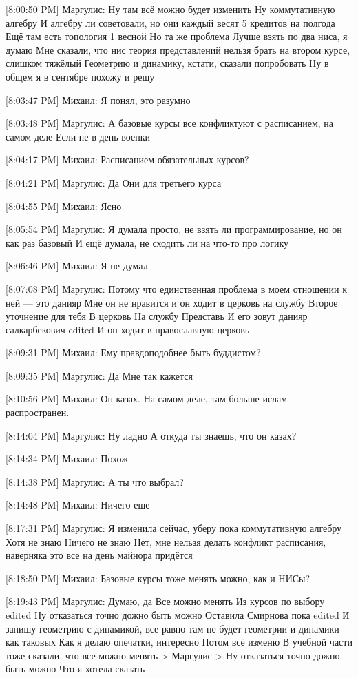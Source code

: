 \documentclass{article}
\begin{document}
[8:00:50 PM] Маргулис:
Ну там всё можно будет изменить
 Ну коммутативную алгебру
 И алгебру ли советовали, но они каждый весят 5 кредитов на полгода
 Ещё там есть топология 1 весной
 Но та же проблема
 Лучше взять по два ниса, я думаю
 Мне сказали, что нис теория представлений нельзя брать на втором курсе, слишком тяжёлый
 Геометрию и динамику, кстати, сказали попробовать
 Ну в общем я в сентябре похожу и решу

[8:03:47 PM] Михаил:
Я понял, это разумно

[8:03:48 PM] Маргулис:
А базовые курсы все конфликтуют с расписанием, на самом деле
 Если не в день военки

[8:04:17 PM] Михаил:
Расписанием обязательных курсов?

[8:04:21 PM] Маргулис:
Да
 Они для третьего курса

[8:04:55 PM] Михаил:
Ясно

[8:05:54 PM] Маргулис:
Я думала просто, не взять ли программирование, но он как раз базовый
 И ещё думала, не сходить ли на что-то про логику

[8:06:46 PM] Михаил:
Я не думал

[8:07:08 PM] Маргулис:
Потому что единственная проблема в моем отношении к ней — это данияр
 Мне он не нравится и он ходит в церковь на службу
 Второе уточнение для тебя
 В церковь
 На службу
 Представь
 И его зовут данияр салкарбекович
edited 
И он ходит в православную церковь

[8:09:31 PM] Михаил:
Ему правдоподобнее быть буддистом?

[8:09:35 PM] Маргулис:
Да
 Мне так кажется

[8:10:56 PM] Михаил:
Он казах. На самом деле, там больше ислам распространен.

[8:14:04 PM] Маргулис:
Ну ладно
 А откуда ты знаешь, что он казах?

[8:14:34 PM] Михаил:
Похож

[8:14:38 PM] Маргулис:
А ты что выбрал?

[8:14:48 PM] Михаил:
Ничего еще

[8:17:31 PM] Маргулис:
Я изменила сейчас, уберу пока коммутативную алгебру
 Хотя не знаю
 Ничего не знаю
 Нет, мне нельзя делать конфликт расписания, наверняка это все на день майнора придётся

[8:18:50 PM] Михаил:
Базовые курсы тоже менять можно, как и НИСы?

[8:19:43 PM] Маргулис:
Думаю, да
 Все можно менять
 Из курсов по выбору
edited 
Ну отказаться точно дожно быть можно
 Оставила Смирнова пока
edited 
И запишу геометрию с динамикой, все равно там не будет геометрии и динамики как таковых
 Как я делаю опечатки, интересно
 Потом всё изменю
 В учебной части тоже сказали, что все можно менять
> Маргулис
> Ну отказаться точно дожно быть можно
Что я хотела сказать
\end{document}
